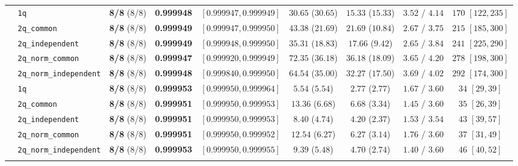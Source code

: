 \documentclass[11pt,a4paper]{article}
\begin{document}
\begin{table}[H]
{\begin{tabular}{llccccccc}
\midrule
{}
 & \texttt{1q} & \textbf{8/8} (8/8) & \textbf{0.999948} & $[0.999947, 0.999949]$ & $30.65$ ($30.65$) & $15.33$ ($15.33$) & $3.52$ / $4.14$ & $170$ $[122, 235]$ \\
 & \texttt{2q\_common} & \textbf{8/8} (8/8) & \textbf{0.999949} & $[0.999947, 0.999950]$ & $43.38$ ($21.69$) & $21.69$ ($10.84$) & $2.67$ / $3.75$ & $215$ $[185, 300]$ \\
 & \texttt{2q\_independent} & \textbf{8/8} (8/8) & \textbf{0.999949} & $[0.999948, 0.999950]$ & $35.31$ ($18.83$) & $17.66$ ($9.42$) & $2.65$ / $3.84$ & $241$ $[225, 290]$ \\
 & \texttt{2q\_norm\_common} & \textbf{8/8} (8/8) & \textbf{0.999947} & $[0.999920, 0.999949]$ & $72.35$ ($36.18$) & $36.18$ ($18.09$) & $3.65$ / $4.20$ & $278$ $[198, 300]$ \\
 & \texttt{2q\_norm\_independent} & \textbf{8/8} (8/8) & \textbf{0.999948} & $[0.999840, 0.999950]$ & $64.54$ ($35.00$) & $32.27$ ($17.50$) & $3.69$ / $4.02$ & $292$ $[174, 300]$ \\
\midrule
{}
 & \texttt{1q} & \textbf{8/8} (8/8) & \textbf{0.999953} & $[0.999950, 0.999964]$ & $5.54$ ($5.54$) & $2.77$ ($2.77$) & $1.67$ / $3.60$ & $34$ $[29, 39]$ \\
 & \texttt{2q\_common} & \textbf{8/8} (8/8) & \textbf{0.999951} & $[0.999950, 0.999953]$ & $13.36$ ($6.68$) & $6.68$ ($3.34$) & $1.45$ / $3.60$ & $35$ $[26, 39]$ \\
 & \texttt{2q\_independent} & \textbf{8/8} (8/8) & \textbf{0.999951} & $[0.999950, 0.999953]$ & $8.40$ ($4.74$) & $4.20$ ($2.37$) & $1.53$ / $3.54$ & $43$ $[39, 57]$ \\
 & \texttt{2q\_norm\_common} & \textbf{8/8} (8/8) & \textbf{0.999951} & $[0.999950, 0.999952]$ & $12.54$ ($6.27$) & $6.27$ ($3.14$) & $1.76$ / $3.60$ & $37$ $[31, 49]$ \\
 & \texttt{2q\_norm\_independent} & \textbf{8/8} (8/8) & \textbf{0.999953} & $[0.999950, 0.999955]$ & $9.39$ ($5.48$) & $4.70$ ($2.74$) & $1.40$ / $3.60$ & $46$ $[40, 52]$ \\
\midrule
{}

\end{tabular}}
\end{table}
\end{document}
